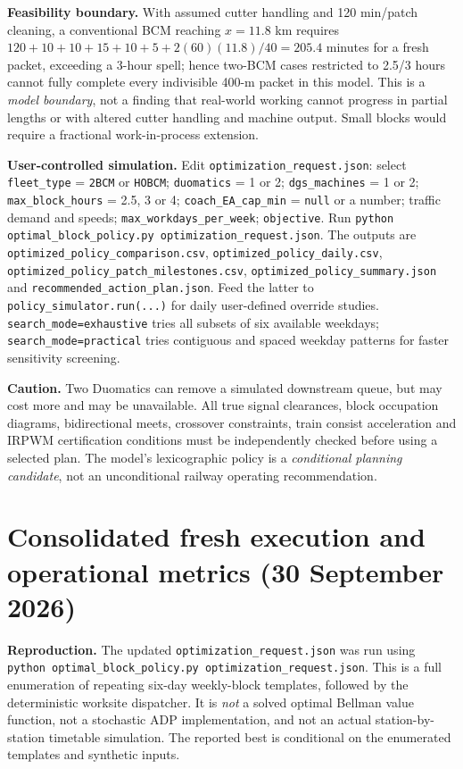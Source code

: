 \documentclass[10pt,a4paper]{article}
\begin{document}
\textbf{Feasibility boundary.} With assumed cutter handling and 120 min/patch cleaning, a conventional BCM reaching $x=11.8$ km requires $120+10+10+15+10+5+2(60)(11.8)/40=205.4$ minutes for a fresh packet, exceeding a 3-hour spell; hence two-BCM cases restricted to 2.5/3 hours cannot fully complete every indivisible 400-m packet in this model. This is a \emph{model boundary}, not a finding that real-world working cannot progress in partial lengths or with altered cutter handling and machine output. Small blocks would require a fractional work-in-process extension.

\textbf{User-controlled simulation.} Edit \texttt{optimization\_request.json}: select \texttt{fleet\_type} = \texttt{2BCM} or \texttt{HOBCM}; \texttt{duomatics} = 1 or 2; \texttt{dgs\_machines} = 1 or 2; \texttt{max\_block\_hours} = 2.5, 3 or 4; \texttt{coach\_EA\_cap\_min} = \texttt{null} or a number; traffic demand and speeds; \texttt{max\_workdays\_per\_week}; \texttt{objective}. Run \texttt{python optimal\_block\_policy.py optimization\_request.json}. The outputs are \texttt{optimized\_policy\_comparison.csv}, \texttt{optimized\_policy\_daily.csv}, \texttt{optimized\_policy\_patch\_milestones.csv}, \texttt{optimized\_policy\_summary.json} and \texttt{recommended\_action\_plan.json}. Feed the latter to \texttt{policy\_simulator.run(...)} for daily user-defined override studies. \texttt{search\_mode=exhaustive} tries all subsets of six available weekdays; \texttt{search\_mode=practical} tries contiguous and spaced weekday patterns for faster sensitivity screening.

\textbf{Caution.} Two Duomatics can remove a simulated downstream queue, but may cost more and may be unavailable. All true signal clearances, block occupation diagrams, bidirectional meets, crossover constraints, train consist acceleration and IRPWM certification conditions must be independently checked before using a selected plan. The model's lexicographic policy is a \emph{conditional planning candidate}, not an unconditional railway operating recommendation.


\section{Consolidated fresh execution and operational metrics (30 September 2026)}
\textbf{Reproduction.} The updated \texttt{optimization\_request.json} was run using
\texttt{python optimal\_block\_policy.py optimization\_request.json}. This is a full enumeration of repeating six-day weekly-block templates, followed by the deterministic worksite dispatcher. It is \emph{not} a solved optimal Bellman value function, not a stochastic ADP implementation, and not an actual station-by-station timetable simulation. The reported best is conditional on the enumerated templates and synthetic inputs.
\end{document}
